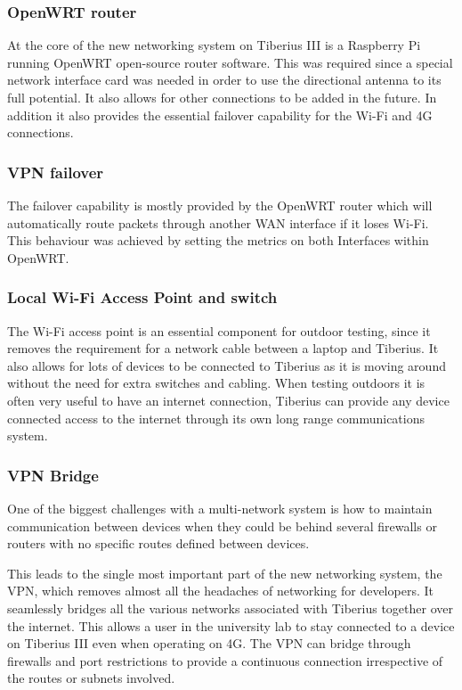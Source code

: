 \subsubsection{OpenWRT router}
At the core of the new networking system on Tiberius III is a Raspberry Pi running OpenWRT open-source router software. This was required since a special network interface card was needed in order to use the directional antenna to its full potential. It also allows for other connections to be added in the future. In addition it also provides the essential failover capability for the Wi-Fi and 4G connections.

\subsubsection{VPN failover}
The failover capability is mostly provided by the OpenWRT router which will automatically route packets through another WAN interface if it loses Wi-Fi. This behaviour was achieved by setting the metrics on both Interfaces within OpenWRT.

\subsubsection{Local Wi-Fi Access Point and switch}
The Wi-Fi access point is an essential component for outdoor testing, since it removes the requirement for a network cable between a laptop and Tiberius. It also allows for lots of devices to be connected to Tiberius as it is moving around without the need for extra switches and cabling. When testing outdoors it is often very useful to have an internet connection, Tiberius can  provide any device connected access to the internet through its own long range communications system.

\subsubsection{VPN Bridge} 
One of the biggest challenges with a multi-network system is how to maintain communication between devices when they could be behind several firewalls or routers with no specific routes defined between devices.

This leads to the single most important part of the new networking system, the VPN, which removes almost all the headaches of networking for developers. It seamlessly bridges all the various networks associated with Tiberius together over the internet. This allows a user in the university lab to stay connected to a device on Tiberius III even when operating on 4G. The VPN can bridge through firewalls and port restrictions to provide a continuous connection irrespective of the routes or subnets involved.

